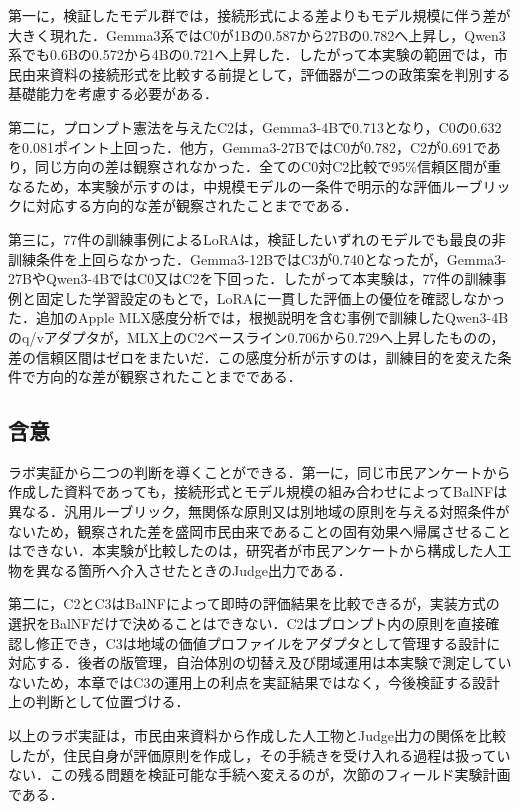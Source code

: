 第一に，検証したモデル群では，接続形式による差よりもモデル規模に伴う差が大きく現れた．Gemma3系ではC0が1Bの0.587から27Bの0.782へ上昇し，Qwen3系でも0.6Bの0.572から4Bの0.721へ上昇した．したがって本実験の範囲では，市民由来資料の接続形式を比較する前提として，評価器が二つの政策案を判別する基礎能力を考慮する必要がある．

第二に，プロンプト憲法を与えたC2は，Gemma3-4Bで0.713となり，C0の0.632を0.081ポイント上回った．他方，Gemma3-27BではC0が0.782，C2が0.691であり，同じ方向の差は観察されなかった．全てのC0対C2比較で95\%信頼区間が重なるため，本実験が示すのは，中規模モデルの一条件で明示的な評価ルーブリックに対応する方向的な差が観察されたことまでである．

第三に，77件の訓練事例によるLoRAは，検証したいずれのモデルでも最良の非訓練条件を上回らなかった．Gemma3-12BではC3が0.740となったが，Gemma3-27BやQwen3-4BではC0又はC2を下回った．したがって本実験は，77件の訓練事例と固定した学習設定のもとで，LoRAに一貫した評価上の優位を確認しなかった．追加のApple MLX感度分析では，根拠説明を含む事例で訓練したQwen3-4Bのq/vアダプタが，MLX上のC2ベースライン0.706から0.729へ上昇したものの，差の信頼区間はゼロをまたいだ．この感度分析が示すのは，訓練目的を変えた条件で方向的な差が観察されたことまでである．

\subsection{含意}

ラボ実証から二つの判断を導くことができる．第一に，同じ市民アンケートから作成した資料であっても，接続形式とモデル規模の組み合わせによってBalNFは異なる．汎用ルーブリック，無関係な原則又は別地域の原則を与える対照条件がないため，観察された差を盛岡市民由来であることの固有効果へ帰属させることはできない．本実験が比較したのは，研究者が市民アンケートから構成した人工物を異なる箇所へ介入させたときのJudge出力である．

第二に，C2とC3はBalNFによって即時の評価結果を比較できるが，実装方式の選択をBalNFだけで決めることはできない．C2はプロンプト内の原則を直接確認し修正でき，C3は地域の価値プロファイルをアダプタとして管理する設計に対応する．後者の版管理，自治体別の切替え及び閉域運用は本実験で測定していないため，本章ではC3の運用上の利点を実証結果ではなく，今後検証する設計上の判断として位置づける．

以上のラボ実証は，市民由来資料から作成した人工物とJudge出力の関係を比較したが，住民自身が評価原則を作成し，その手続きを受け入れる過程は扱っていない．この残る問題を検証可能な手続へ変えるのが，次節のフィールド実験計画である．

